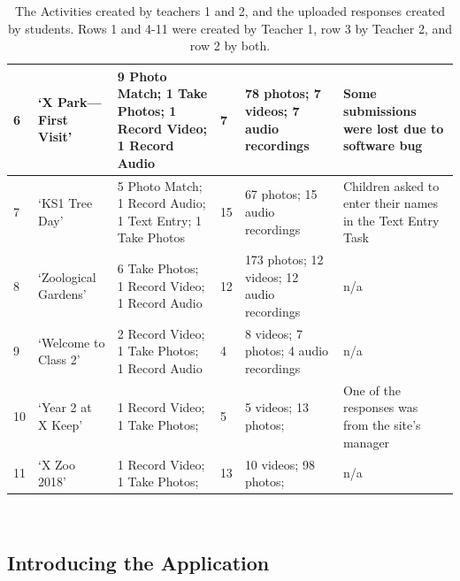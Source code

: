 \begin{table}[]
\begin{tabularx}{\linewidth}{ 
| p{4mm} 
| >{\raggedright\arraybackslash}X 
| >{\raggedright\arraybackslash}X 
| p{13mm}
| >{\raggedright\arraybackslash}X 
| >{\raggedright\arraybackslash}X 
|}
\hline
    \small 6 
    & \footnotesize `X Park---First Visit' 
    & \footnotesize 9 Photo Match; 1 Take Photos; 1 Record Video; 1 Record Audio
    & \footnotesize 7 
    & \footnotesize 78 photos; 7 videos; 7 audio recordings
    & \footnotesize Some submissions were lost due to software bug\\
\hline
    \small 7 
    & \footnotesize `KS1 Tree Day' 
    & \footnotesize 5 Photo Match; 1 Record Audio; 1 Text Entry; 1 Take Photos
    & \footnotesize 15 
    & \footnotesize 67 photos; 15 audio recordings
    & \footnotesize Children asked to enter their names in the Text Entry Task\\
\hline
    \small 8 
    & \footnotesize `Zoological Gardens' 
    & \footnotesize 6 Take Photos; 1 Record Video; 1 Record Audio
    & \footnotesize 12 
    & \footnotesize 173 photos; 12 videos; 12 audio recordings
    & \footnotesize n/a\\
\hline
    \small 9 
    & \footnotesize `Welcome to Class 2' 
    & \footnotesize 2 Record Video; 1 Take Photos; 1 Record Audio
    & \footnotesize 4 
    & \footnotesize 8 videos; 7 photos; 4 audio recordings
    & \footnotesize n/a\\
\hline
    \small 10 
    & \footnotesize `Year 2 at X Keep' 
    & \footnotesize 1 Record Video; 1 Take Photos;
    & \footnotesize 5 
    & \footnotesize 5 videos; 13 photos;
    & \footnotesize One of the responses was from the site's manager\\
    \hline
    \small 11 
    & \footnotesize `X Zoo 2018' 
    & \footnotesize 1 Record Video; 1 Take Photos;
    & \footnotesize 13 
    & \footnotesize 10 videos; 98 photos;
    & \footnotesize n/a\\
\hline
\end{tabularx}
    \caption[The Activities created by teachers 1 and 2, and the uploaded responses created by students.]{The Activities created by teachers 1 and 2, and the uploaded responses created by students. Rows 1 and 4-11 were created by Teacher 1, row 3 by Teacher 2, and row 2 by both.}~\label{tab:TeacherActivities}
\end{table}

\subsection{Introducing the Application}
\label{sec:IntroducingOurPlaceSchool1}

